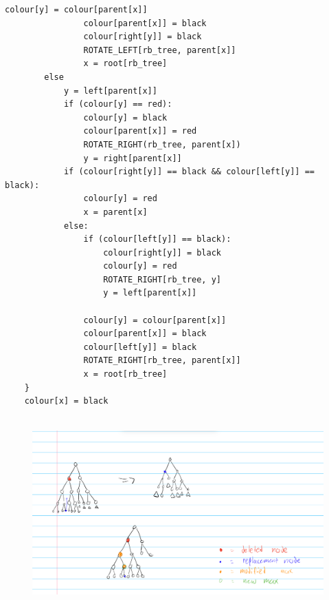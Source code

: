 \documentclass[12pt]{article}
\theoremstyle{definition}
\theoremstyle{remark}
\begin{document}
\begin{enumerate}
\begin{enumerate}
\begin{lstlisting}[caption = fixing a red-black tree after deletion]
                colour[y] = colour[parent[x]]
                colour[parent[x]] = black 
                colour[right[y]] = black 
                ROTATE_LEFT[rb_tree, parent[x]] 
                x = root[rb_tree]
        else
            y = left[parent[x]]
            if (colour[y] == red):
                colour[y] = black 
                colour[parent[x]] = red 
                ROTATE_RIGHT(rb_tree, parent[x])
                y = right[parent[x]]
            if (colour[right[y]] == black && colour[left[y]] == black):
                colour[y] = red 
                x = parent[x]
            else:
                if (colour[left[y]] == black): 
                    colour[right[y]] = black 
                    colour[y] = red
                    ROTATE_RIGHT[rb_tree, y]
                    y = left[parent[x]]
                    
                colour[y] = colour[parent[x]]
                colour[parent[x]] = black 
                colour[left[y]] = black 
                ROTATE_RIGHT[rb_tree, parent[x]] 
                x = root[rb_tree]
    }
    colour[x] = black
    
\end{lstlisting}

\begin{figure}[htb!]
     \centering
     \includegraphics[scale=0.2]{graphics/Delete_diagram.jpeg}
\end{figure}


\end{enumerate}
\end{enumerate}
\end{document}
